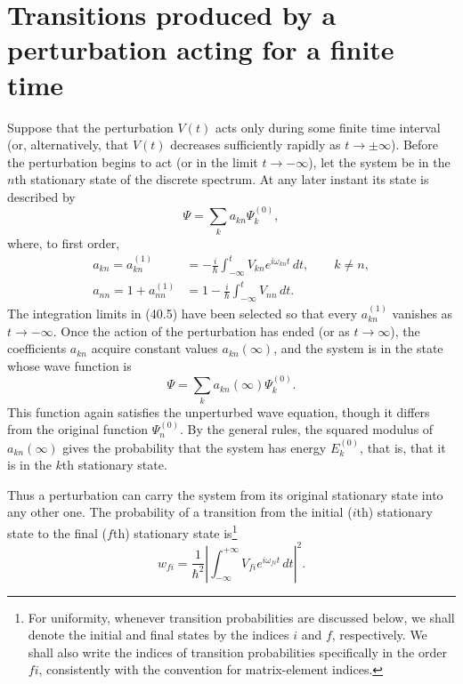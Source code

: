 \section[Transitions produced by a perturbation]{Transitions produced by a perturbation
acting for a finite time}

Suppose that the perturbation $V(t)$ acts only during some finite time interval
(or, alternatively, that $V(t)$ decreases sufficiently rapidly as
$t\to\pm\infty$). Before the perturbation begins to act (or in the limit
$t\to-\infty$), let the system be in the $n$th stationary state of the
discrete spectrum. At any later instant its state is described by
\[
  \Psi=\sum_k a_{kn}\Psi_k^{(0)},
\]
where, to first order,
\begin{equation}
 \begin{aligned}
  a_{kn}=a_{kn}^{(1)}&=-\frac i\hbar\int_{-\infty}^t
    V_{kn}e^{i\omega_{kn}t}\,dt,\qquad k\ne n,\\
  a_{nn}=1+a_{nn}^{(1)}&=1-\frac i\hbar\int_{-\infty}^tV_{nn}\,dt.
 \end{aligned}
 \tag{41.1}
\end{equation}
The integration limits in (40.5) have been selected so that every
$a_{kn}^{(1)}$ vanishes as $t\to-\infty$. Once the action of the perturbation
has ended (or as $t\to\infty$), the coefficients $a_{kn}$ acquire constant
values $a_{kn}(\infty)$, and the system is in the state whose wave function is
\[
  \Psi=\sum_k a_{kn}(\infty)\Psi_k^{(0)}.
\]
This function again satisfies the unperturbed wave equation, though it differs
from the original function $\Psi_n^{(0)}$. By the general rules, the squared
modulus of $a_{kn}(\infty)$ gives the probability that the system has energy
$E_k^{(0)}$, that is, that it is in the $k$th stationary state.

Thus a perturbation can carry the system from its original stationary state
into any other one. The probability of a transition from the initial ($i$th)
stationary state to the final ($f$th) stationary state is\footnote{For
uniformity, whenever transition probabilities are discussed below, we shall
denote the initial and final states by the indices $i$ and $f$, respectively.
We shall also write the indices of transition probabilities specifically in
the order $fi$, consistently with the convention for matrix-element indices.}
\begin{equation}
  w_{fi}=\frac1{\hbar^2}\left|
    \int_{-\infty}^{+\infty}V_{fi}e^{i\omega_{fi}t}\,dt
  \right|^2.
  \tag{41.2}
\end{equation}

